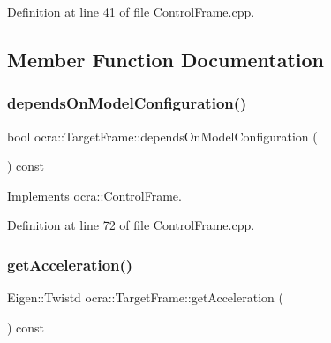 Definition at line 41 of file Control\+Frame.\+cpp.



\subsection{Member Function Documentation}
\hypertarget{classocra_1_1TargetFrame_ab4512f64463c359090ffdbead9a9e349}{}\label{classocra_1_1TargetFrame_ab4512f64463c359090ffdbead9a9e349} 
\subsubsection{\texorpdfstring{depends\+On\+Model\+Configuration()}{dependsOnModelConfiguration()}}
{\footnotesize\ttfamily bool ocra\+::\+Target\+Frame\+::depends\+On\+Model\+Configuration (\begin{DoxyParamCaption}{ }\end{DoxyParamCaption}) const\hspace{0.3cm}{\ttfamily [virtual]}}



Implements \hyperlink{classocra_1_1ControlFrame_a65833d1f3f42bc8d452f8b1fb671e142}{ocra\+::\+Control\+Frame}.



Definition at line 72 of file Control\+Frame.\+cpp.

\hypertarget{classocra_1_1TargetFrame_ab38d91f0d2f90b102259ec155a8a1245}{}\label{classocra_1_1TargetFrame_ab38d91f0d2f90b102259ec155a8a1245} 
\subsubsection{\texorpdfstring{get\+Acceleration()}{getAcceleration()}}
{\footnotesize\ttfamily Eigen\+::\+Twistd ocra\+::\+Target\+Frame\+::get\+Acceleration (\begin{DoxyParamCaption}{ }\end{DoxyParamCaption}) const\hspace{0.3cm}{\ttfamily [virtual]}}



